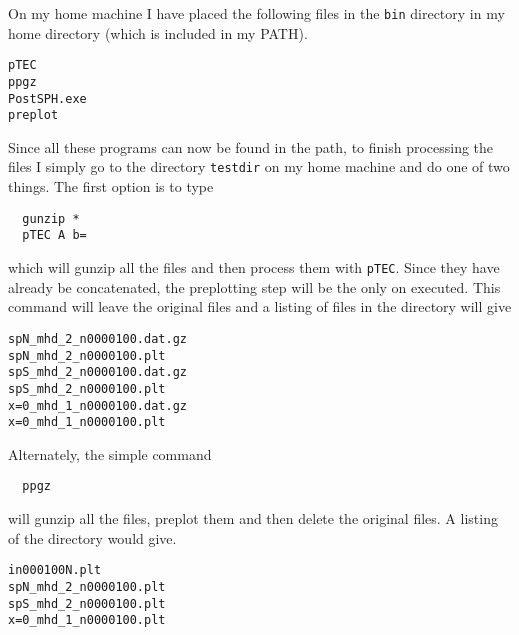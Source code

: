On my home machine I have placed the following files in the {\tt bin}
directory in my home directory (which is included in my PATH).
\begin{verbatim}
pTEC
ppgz
PostSPH.exe
preplot
\end{verbatim}
Since all these programs can now be found in the path, to finish processing
the files I simply go to the directory {\tt testdir} on my home
machine and do one of two things.  The first option is to type
\begin{verbatim}
  gunzip *
  pTEC A b=
\end{verbatim}
which will gunzip all the files and then process them with {\tt pTEC}.
Since they have already be concatenated, the preplotting step will be
the only on executed.  This command will leave the original files and a
listing of files in the directory will give
\begin{verbatim}
spN_mhd_2_n0000100.dat.gz
spN_mhd_2_n0000100.plt
spS_mhd_2_n0000100.dat.gz
spS_mhd_2_n0000100.plt
x=0_mhd_1_n0000100.dat.gz
x=0_mhd_1_n0000100.plt
\end{verbatim}
Alternately, the simple command
\begin{verbatim}
  ppgz
\end{verbatim}
will gunzip all the files, preplot them and then delete the original files.
A listing of the directory would give.
\begin{verbatim}
in000100N.plt
spN_mhd_2_n0000100.plt
spS_mhd_2_n0000100.plt
x=0_mhd_1_n0000100.plt
\end{verbatim}

%


